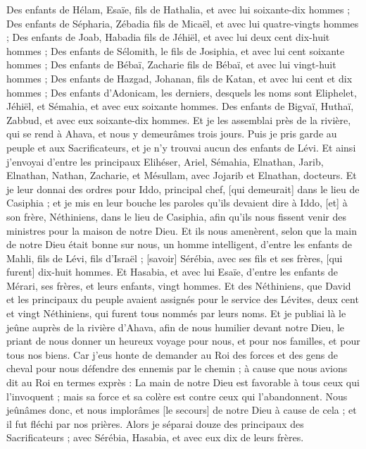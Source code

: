 \begin{multicols}{2}
Des enfants de Hélam, Esaïe, fils de Hathalia, et avec lui soixante-dix hommes ;
Des enfants de Sépharia, Zébadia fils de Micaël, et avec lui quatre-vingts hommes ;
Des enfants de Joab, Habadia fils de Jéhiël, et avec lui deux cent dix-huit hommes ;
Des enfants de Sélomith, le fils de Josiphia, et avec lui cent soixante hommes ;
Des enfants de Bébaï, Zacharie fils de Bébaï, et avec lui vingt-huit hommes ;
Des enfants de Hazgad, Johanan, fils de Katan, et avec lui cent et dix hommes ;
Des enfants d'Adonicam, les derniers, desquels les noms sont Eliphelet, Jéhiël, et Sémahia, et avec eux soixante hommes.
Des enfants de Bigvaï, Huthaï, Zabbud, et avec eux soixante-dix hommes.
Et je les assemblai près de la rivière, qui se rend à Ahava, et nous y demeurâmes trois jours. Puis je pris garde au peuple et aux Sacrificateurs, et je n'y trouvai aucun des enfants de Lévi.
Et ainsi j'envoyai d'entre les principaux Elihéser, Ariel, Sémahia, Elnathan, Jarib, Elnathan, Nathan, Zacharie, et Mésullam, avec Jojarib et Elnathan, docteurs.
Et je leur donnai des ordres pour Iddo, principal chef, [qui demeurait] dans le lieu de Casiphia ; et je mis en leur bouche les paroles qu'ils devaient dire à Iddo, [et] à son frère, Néthiniens, dans le lieu de Casiphia, afin qu'ils nous fissent venir des ministres pour la maison de notre Dieu.
Et ils nous amenèrent, selon que la main de notre Dieu était bonne sur nous, un homme intelligent, d'entre les enfants de Mahli, fils de Lévi, fils d'Israël ; [savoir] Sérébia, avec ses fils et ses frères, [qui furent] dix-huit hommes.
Et Hasabia, et avec lui Esaïe, d'entre les enfants de Mérari, ses frères, et leurs enfants, vingt hommes.
Et des Néthiniens, que David et les principaux du peuple avaient assignés pour le service des Lévites, deux cent et vingt Néthiniens, qui furent tous nommés par leurs noms.
Et je publiai là le jeûne auprès de la rivière d'Ahava, afin de nous humilier devant notre Dieu, le priant de nous donner un heureux voyage pour nous, et pour nos familles, et pour tous nos biens.
Car j'eus honte de demander au Roi des forces et des gens de cheval pour nous défendre des ennemis par le chemin ; à cause que nous avions dit au Roi en termes exprès : La main de notre Dieu est favorable à tous ceux qui l'invoquent ; mais sa force et sa colère est contre ceux qui l'abandonnent.
Nous jeûnâmes donc, et nous implorâmes [le secours] de notre Dieu à cause de cela ; et il fut fléchi par nos prières.
Alors je séparai douze des principaux des Sacrificateurs ; avec Sérébia, Hasabia, et avec eux dix de leurs frères.

\end{multicols}
